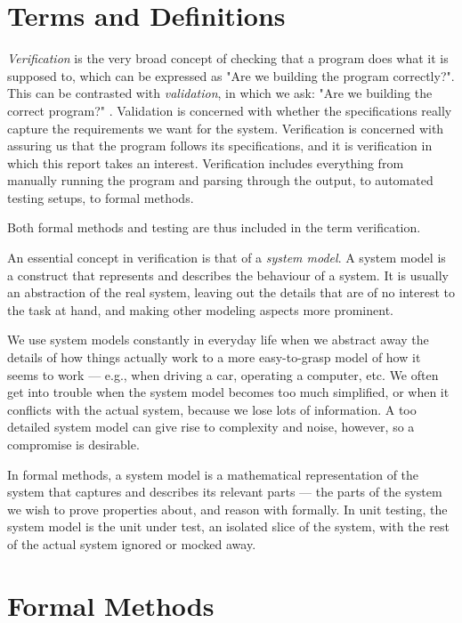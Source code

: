 \documentclass[a4paper,11pt]{kth-mag}
\theoremstyle{definition}
\begin{document}
\section{Terms and Definitions}
\label{section-background-definitions}
\label{section-definition-verification}
\label{section-system-model}

\textit{Verification} is the very broad concept of checking that a program does
what it is supposed to, which can be expressed as "Are we building the program
correctly?". This can be contrasted with \textit{validation}, in which we ask:
"Are we building the correct program?" \cite{boehm81engineeringeconomics}.
Validation is concerned with whether the specifications really capture the
requirements we want for the system. Verification is concerned with assuring us
that the program follows its specifications, and it is verification in which
this report takes an interest. Verification includes everything from manually
running the program and parsing through the output, to automated testing
setups, to formal methods.

Both formal methods and testing are thus included in the term verification.

An essential concept in verification is that of a \textit{system model}. A
system model is a construct that represents and describes the behaviour of a
system. It is usually an abstraction of the real system, leaving out the
details that are of no interest to the task at hand, and making other modeling
aspects more prominent.

We use system models constantly in everyday life when we abstract away the
details of how things actually work to a more easy-to-grasp model of how it
seems to work --- e.g., when driving a car, operating a computer, etc. We often
get into trouble when the system model becomes too much simplified, or when it
conflicts with the actual system, because we lose lots of information. A too
detailed system model can give rise to complexity and noise, however, so a
compromise is desirable.

In formal methods, a system model is a mathematical representation of the
system that captures and describes its relevant parts --- the parts of the
system we wish to prove properties about, and reason with formally. In unit
testing, the system model is the unit under test, an isolated slice of the
system, with the rest of the actual system ignored or mocked away.


\section{Formal Methods} \label{section-formal-methods}
\end{document}
